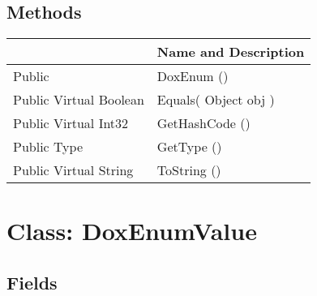 \documentclass[11pt, oneside, a4paper]{book}
\begin{document}
\subsection{Methods}
\begin{center}
\begin{tabular}{| p{3cm} | p{12cm} | }
\hline
\textbf{ } & \textbf{ Name and Description}\\
\hline
 Public  &  DoxEnum ()\hypertarget{SoftwareEngineeringTools.{}Documentation.{}DoxEnum.{}DoxEnum}{}\\
\hline
 Public  Virtual  Boolean &  Equals(\hypertarget{SoftwareEngineeringTools.{}Documentation.{}DoxEnum.{}Equals\_Object}{} Object  obj  )\\
\hline
 Public  Virtual  Int32 &  GetHashCode ()\hypertarget{SoftwareEngineeringTools.{}Documentation.{}DoxEnum.{}GetHashCode}{}\\
\hline
 Public  Type &  GetType ()\hypertarget{SoftwareEngineeringTools.{}Documentation.{}DoxEnum.{}GetType}{}\\
\hline
 Public  Virtual  String &  ToString ()\hypertarget{SoftwareEngineeringTools.{}Documentation.{}DoxEnum.{}ToString}{}\\
\hline
\end{tabular}
\end{center}
 


\hypertarget{SoftwareEngineeringTools.{}Documentation.{}DoxEnumValue}{}
\section{Class: DoxEnumValue}

\subsection{Fields}
\end{document}
